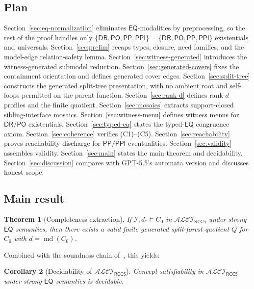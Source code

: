 \documentclass[11pt]{article}
\newtheorem{theorem}{Theorem}[section]
\newtheorem{corollary}[theorem]{Corollary}
\theoremstyle{definition}
\theoremstyle{remark}
\newcommand{\DR}{\mathsf{DR}}
\newcommand{\PO}{\mathsf{PO}}
\newcommand{\PP}{\mathsf{PP}}
\newcommand{\PPI}{\mathsf{PPI}}
\newcommand{\EQ}{\mathsf{EQ}}
\newcommand{\BaseEdge}{\{\DR,\PO,\PP,\PPI\}}
\newcommand{\md}{\operatorname{md}}
\newcommand{\ALCIRCC}[1]{\mathcal{ALCI}_{\mathsf{RCC#1}}}
\begin{document}
\subsection{Plan}

Section~\ref{sec:eq-normalization} eliminates $\EQ$-modalities by
preprocessing, so the rest of the proof handles only
$\BaseEdge = \{\DR,\PO,\PP,\PPI\}$ existentials and universals.
Section~\ref{sec:prelim} recaps types, closure, need families, and
the model-edge relation-safety lemma.
Section~\ref{sec:witness-generated} introduces the
witness-generated submodel reduction.
Section~\ref{sec:generated-covers} fixes the containment
orientation and defines generated cover edges.
Section~\ref{sec:split-tree} constructs the generated split-tree
presentation, with no ambient root and self-loops permitted on the
parent function.
Section~\ref{sec:rank-d} defines rank-$d$ profiles and the finite
quotient.
Section~\ref{sec:mosaics} extracts support-closed sibling-interface
mosaics.
Section~\ref{sec:witness-menu} defines witness menus for $\DR/\PO$
existentials.
Section~\ref{sec:typed-eq} states the typed-$\EQ$ congruence axiom.
Section~\ref{sec:coherence} verifies (C1)--(C5).
Section~\ref{sec:reachability} proves reachability discharge for
$\PP/\PPI$ eventualities.
Section~\ref{sec:validity} assembles validity.
Section~\ref{sec:main} states the main theorem and decidability.
Section~\ref{sec:discussion} compares with GPT-5.5's automata
version and discusses honest scope.

\subsection{Main result}

\begin{theorem}[Completeness extraction]\label{thm:main}
If $\mathcal{I},d_\ast\models C_0$ in $\ALCIRCC{5}$ under strong
$\EQ$ semantics, then there exists a valid finite generated
split-forest quotient $Q$ for $C_0$ with $d=\md(C_0)$.
\end{theorem}

Combined with the soundness chain of~\cite{SplitForest,GPT55Generated},
this yields:

\begin{corollary}[Decidability of $\ALCIRCC{5}$]\label{cor:decidability}
Concept satisfiability in $\ALCIRCC{5}$ under strong $\EQ$ semantics
is decidable.
\end{corollary}


\end{document}
